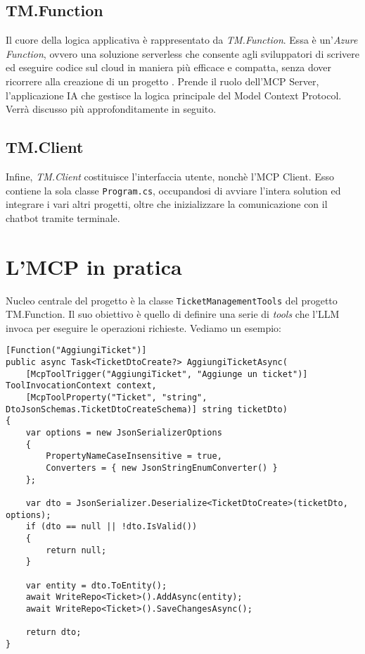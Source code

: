 \subsection{TM.Function}
Il cuore della logica applicativa è rappresentato da \textit{TM.Function}. Essa è un'\textit{Azure Function}, ovvero una soluzione serverless
che consente agli sviluppatori di scrivere ed eseguire codice sul cloud in maniera più efficace e compatta, senza dover ricorrere alla 
creazione di un progetto \cite{azurefunctions_msdocs}. Prende il ruolo dell'MCP Server, l'applicazione IA che gestisce la logica principale del
Model Context Protocol. Verrà discusso più approfonditamente in seguito.

\subsection{TM.Client}
Infine, \textit{TM.Client} costituisce l'interfaccia utente, nonchè l'MCP Client. Esso contiene la sola classe \texttt{Program.cs}, occupandosi
di avviare l'intera solution ed integrare i vari altri progetti, oltre che inizializzare la comunicazione con il chatbot tramite terminale.

\newpage
\section{L'MCP in pratica}
Nucleo centrale del progetto è la classe \texttt{TicketManagementTools} del progetto TM.Function. Il suo obiettivo è quello di definire una serie
di \textit{tools} che l'LLM invoca per eseguire le operazioni richieste. Vediamo un esempio:

\begin{scriptsize}
\begin{verbatim}
[Function("AggiungiTicket")] 
public async Task<TicketDtoCreate?> AggiungiTicketAsync(
    [McpToolTrigger("AggiungiTicket", "Aggiunge un ticket")] ToolInvocationContext context,
    [McpToolProperty("Ticket", "string", DtoJsonSchemas.TicketDtoCreateSchema)] string ticketDto)
{
    var options = new JsonSerializerOptions
    {
        PropertyNameCaseInsensitive = true,
        Converters = { new JsonStringEnumConverter() }
    };

    var dto = JsonSerializer.Deserialize<TicketDtoCreate>(ticketDto, options);
    if (dto == null || !dto.IsValid())
    {
        return null;
    }

    var entity = dto.ToEntity();
    await WriteRepo<Ticket>().AddAsync(entity);
    await WriteRepo<Ticket>().SaveChangesAsync();

    return dto;
}
\end{verbatim}
\end{scriptsize}

